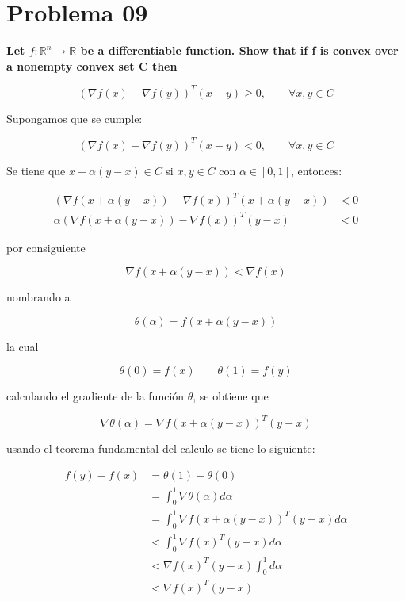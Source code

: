 \section*{Problema 09}

\textbf{Let $f : \mathbb{R}^n \rightarrow \mathbb{R}$ be a differentiable function. Show that if f is convex over a nonempty convex set C then}

\begin{equation*}
    (\nabla f(x)-\nabla f(y))^T (x-y) \geq 0, \qquad \forall x,y \in C
\end{equation*}


Supongamos que se cumple:

\begin{equation*}
    (\nabla f(x)-\nabla f(y))^T (x-y) < 0, \qquad \forall x,y \in C
\end{equation*}

Se tiene que $x+\alpha(y-x) \in C$  si $x,y\in C$ con $\alpha \in [0,1]$, entonces:

\begin{align*}
    (\nabla f(x+\alpha(y-x)) - \nabla f(x))^T (x+\alpha (y-x)) & < 0 \\
    \alpha (\nabla f(x+\alpha(y-x)) - \nabla f(x))^T (y-x)     & < 0
\end{align*}

por consiguiente

\begin{equation*}
    \nabla f(x+\alpha (y-x))  < \nabla f(x)
\end{equation*}

nombrando a

\begin{equation*}
    \theta (\alpha) = f(x+\alpha (y-x))
\end{equation*}

la cual

\begin{equation*}
    \theta(0) = f(x) \qquad \theta(1) = f(y)
\end{equation*}

calculando el gradiente de la función $\theta$, se obtiene que

\begin{equation*}
    \nabla \theta (\alpha) =  \nabla f (x+\alpha (y-x))^T (y-x)
\end{equation*}

usando el teorema fundamental del calculo se tiene lo siguiente:

\begin{align*}
    f(y)-f(x) & = \theta(1) - \theta(0)                            \\
              & = \int_0^1 \nabla\theta(\alpha) d\alpha            \\
              & = \int_0^1 \nabla f(x+\alpha (y-x))^T(y-x) d\alpha \\
              & < \int_0^1 \nabla f(x)^T (y-x) d\alpha             \\
              & < \nabla f(x)^T(y-x) \int_0^1 d\alpha              \\
              & < \nabla f(x)^T(y-x)
\end{align*}


